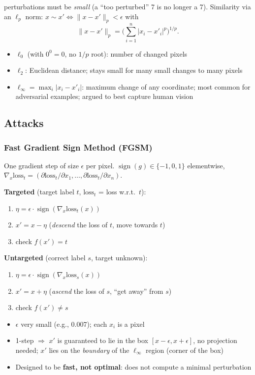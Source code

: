  perturbations must be \emph{small} (a ``too perturbed'' 7 is no
longer a 7). Similarity via an $\ell_p$ norm: $x \sim x' \iff \|x - x'\|_p < \epsilon$ with
\[
  \|x - x'\|_p = \Big(\textstyle\sum_{i=1}^n |x_i - x'_i|^p\Big)^{1/p}.
\]
\begin{itemize}
  \item $\ell_0$ (with $0^0 = 0$, no $1/p$ root): number of changed pixels
  \item $\ell_2$: Euclidean distance; stays small for many small changes to many pixels
  \item $\ell_\infty = \max_i |x_i - x'_i|$: maximum change of any coordinate; most common for
    adversarial examples; argued to best capture human vision
\end{itemize}

\subsection{Attacks}

\subsubsection{Fast Gradient Sign Method (FGSM)}
One gradient step of size $\epsilon$ per pixel. $\operatorname{sign}(g) \in \{-1, 0, 1\}$ elementwise,
$\nabla_x \text{loss}_t = (\partial \text{loss}_t / \partial x_1, \dots, \partial \text{loss}_t / \partial x_n)$.

\textbf{Targeted} (target label $t$, $\text{loss}_t$ = loss w.r.t.\ $t$):
\begin{enumerate}
  \item $\eta = \epsilon \cdot \operatorname{sign}(\nabla_x \text{loss}_t(x))$
  \item $x' = x - \eta$ \quad (\emph{descend} the loss of $t$, move towards $t$)
  \item check $f(x') = t$
\end{enumerate}
\textbf{Untargeted} (correct label $s$, target unknown):
\begin{enumerate}
  \item $\eta = \epsilon \cdot \operatorname{sign}(\nabla_x \text{loss}_s(x))$
  \item $x' = x + \eta$ \quad (\emph{ascend} the loss of $s$, ``get away'' from $s$)
  \item check $f(x') \neq s$
\end{enumerate}
\begin{itemize}
  \item $\epsilon$ very small (e.g., 0.007); each $x_i$ is a pixel
  \item 1-step $\Rightarrow$ $x'$ is guaranteed to lie in the box $[x-\epsilon, x+\epsilon]$, no projection needed;
    $x'$ lies on the \emph{boundary} of the $\ell_\infty$ region (corner of the box)
  \item Designed to be \textbf{fast, not optimal}: does not compute a minimal perturbation
\end{itemize}

